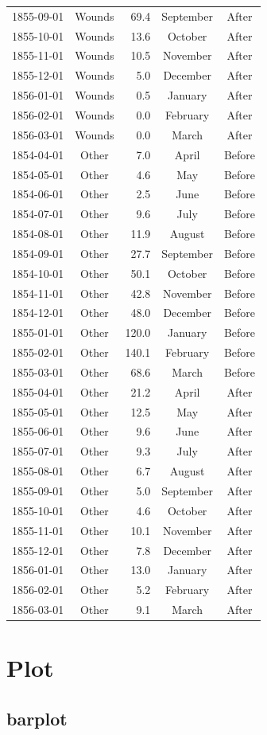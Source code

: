\documentclass[
]{article}
\begin{document}
\begin{longtable}[]{@{}ccrcc@{}}
1855-09-01 & Wounds & 69.4 & September & After\tabularnewline
1855-10-01 & Wounds & 13.6 & October & After\tabularnewline
1855-11-01 & Wounds & 10.5 & November & After\tabularnewline
1855-12-01 & Wounds & 5.0 & December & After\tabularnewline
1856-01-01 & Wounds & 0.5 & January & After\tabularnewline
1856-02-01 & Wounds & 0.0 & February & After\tabularnewline
1856-03-01 & Wounds & 0.0 & March & After\tabularnewline
1854-04-01 & Other & 7.0 & April & Before\tabularnewline
1854-05-01 & Other & 4.6 & May & Before\tabularnewline
1854-06-01 & Other & 2.5 & June & Before\tabularnewline
1854-07-01 & Other & 9.6 & July & Before\tabularnewline
1854-08-01 & Other & 11.9 & August & Before\tabularnewline
1854-09-01 & Other & 27.7 & September & Before\tabularnewline
1854-10-01 & Other & 50.1 & October & Before\tabularnewline
1854-11-01 & Other & 42.8 & November & Before\tabularnewline
1854-12-01 & Other & 48.0 & December & Before\tabularnewline
1855-01-01 & Other & 120.0 & January & Before\tabularnewline
1855-02-01 & Other & 140.1 & February & Before\tabularnewline
1855-03-01 & Other & 68.6 & March & Before\tabularnewline
1855-04-01 & Other & 21.2 & April & After\tabularnewline
1855-05-01 & Other & 12.5 & May & After\tabularnewline
1855-06-01 & Other & 9.6 & June & After\tabularnewline
1855-07-01 & Other & 9.3 & July & After\tabularnewline
1855-08-01 & Other & 6.7 & August & After\tabularnewline
1855-09-01 & Other & 5.0 & September & After\tabularnewline
1855-10-01 & Other & 4.6 & October & After\tabularnewline
1855-11-01 & Other & 10.1 & November & After\tabularnewline
1855-12-01 & Other & 7.8 & December & After\tabularnewline
1856-01-01 & Other & 13.0 & January & After\tabularnewline
1856-02-01 & Other & 5.2 & February & After\tabularnewline
1856-03-01 & Other & 9.1 & March & After\tabularnewline
\bottomrule
\end{longtable}

\hypertarget{plot}{%
\section{Plot}\label{plot}}

\hypertarget{barplot}{%
\subsection{barplot}\label{barplot}}
\end{document}
